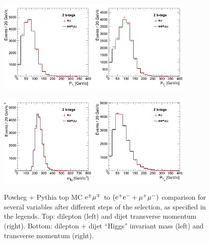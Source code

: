\begin{figure}[!htb]
  \centerline{
    \includegraphics[width=0.43\textwidth]{plots/emu_mc_ZllPt_5}
    \includegraphics[width=0.43\textwidth]{plots/emu_mc_ZjjPt_5}
  }
  \centerline{
    \includegraphics[width=0.43\textwidth]{plots/emu_mc_HiggsMass_5}
    \includegraphics[width=0.43\textwidth]{plots/emu_mc_HiggsPt_5}
  }
  \caption{\label{figap:emumc1} Powheg + Pythia top MC $\mathrm{e}^\pm\mu^\mp$ to
    $(\mathrm{e^+e^-}+\mu^+\mu^-)$ comparison for several variables after different
    steps of the selection, as specified in the legends. Top:
    dilepton (left) and dijet transverse momentum (right). Bottom:
    dilepton + dijet ``Higgs'' invariant mass (left) and transverse
    momentum (right).}
\end{figure} 

